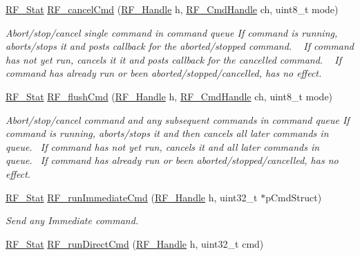 \begin{DoxyCompactItemize}
\hyperlink{_r_f_8h_afdc219ddabc8427ecd552a6c78d9988f}{R\+F\+\_\+\+Stat} \hyperlink{_r_f_8h_aabe22ceae13a372be4ba135318aa849a}{R\+F\+\_\+cancel\+Cmd} (\hyperlink{_r_f_8h_a5e8ab7fc87fb818f435d9b6226ee573f}{R\+F\+\_\+\+Handle} h, \hyperlink{_r_f_8h_acab1f56c62a9fd1ad0a91a46b6da23f1}{R\+F\+\_\+\+Cmd\+Handle} ch, uint8\+\_\+t mode)
\begin{DoxyCompactList}\small\item\em Abort/stop/cancel single command in command queue If command is running, aborts/stops it and posts callback for the aborted/stopped command. ~\newline
 If command has not yet run, cancels it it and posts callback for the cancelled command. ~\newline
 If command has already run or been aborted/stopped/cancelled, has no effect.~\newline
 \end{DoxyCompactList}\item 
\hyperlink{_r_f_8h_afdc219ddabc8427ecd552a6c78d9988f}{R\+F\+\_\+\+Stat} \hyperlink{_r_f_8h_ae3ff5c614f4a63cb4e79c90f9229149a}{R\+F\+\_\+flush\+Cmd} (\hyperlink{_r_f_8h_a5e8ab7fc87fb818f435d9b6226ee573f}{R\+F\+\_\+\+Handle} h, \hyperlink{_r_f_8h_acab1f56c62a9fd1ad0a91a46b6da23f1}{R\+F\+\_\+\+Cmd\+Handle} ch, uint8\+\_\+t mode)
\begin{DoxyCompactList}\small\item\em Abort/stop/cancel command and any subsequent commands in command queue If command is running, aborts/stops it and then cancels all later commands in queue.~\newline
 If command has not yet run, cancels it and all later commands in queue.~\newline
 If command has already run or been aborted/stopped/cancelled, has no effect.~\newline
 \end{DoxyCompactList}\item 
\hyperlink{_r_f_8h_afdc219ddabc8427ecd552a6c78d9988f}{R\+F\+\_\+\+Stat} \hyperlink{_r_f_8h_a6159b409f8d99954529a8ebf6f98cd85}{R\+F\+\_\+run\+Immediate\+Cmd} (\hyperlink{_r_f_8h_a5e8ab7fc87fb818f435d9b6226ee573f}{R\+F\+\_\+\+Handle} h, uint32\+\_\+t $\ast$p\+Cmd\+Struct)
\begin{DoxyCompactList}\small\item\em Send any Immediate command. ~\newline
 \end{DoxyCompactList}\item 
\hyperlink{_r_f_8h_afdc219ddabc8427ecd552a6c78d9988f}{R\+F\+\_\+\+Stat} \hyperlink{_r_f_8h_aafce617271300f2bee1a52ebda6d654e}{R\+F\+\_\+run\+Direct\+Cmd} (\hyperlink{_r_f_8h_a5e8ab7fc87fb818f435d9b6226ee573f}{R\+F\+\_\+\+Handle} h, uint32\+\_\+t cmd)

\end{DoxyCompactItemize}
